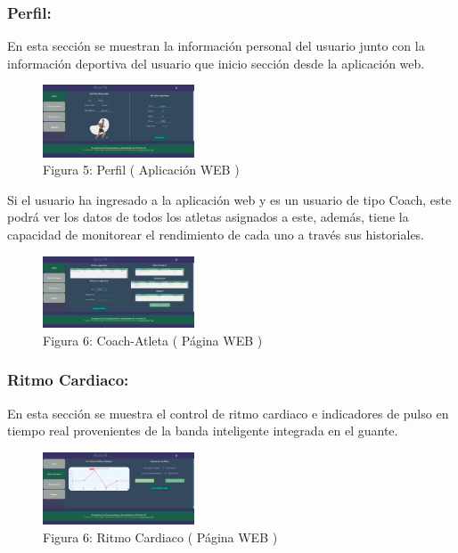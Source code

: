 \documentclass[osajnl,twocolumn,showpacs,superscriptaddress,10pt]{revtex4-1}
\begin{document}
\subsubsection{Perfil:}
    En esta sección se muestran la información personal del usuario junto con la información deportiva del usuario que inicio sección desde la aplicación web.
    
\begin{figure} [H] \centering 
\caption{Figura 5: Perfil ( Aplicación WEB )}
\includegraphics[width=0.4\textwidth]{Perfil.PNG}
\end{figure}

    Si el usuario ha ingresado a la aplicación web y es un usuario de tipo Coach, este podrá ver los datos de todos los atletas asignados a este, además, tiene la capacidad de monitorear el rendimiento de cada uno a través sus historiales.
    
\begin{figure} [H] \centering 
\caption{Figura 6: Coach-Atleta ( Página WEB )}
\includegraphics[width=0.4\textwidth]{CoachAtleta.PNG}
\end{figure}

\subsubsection{Ritmo Cardiaco:}
    En esta sección se muestra el control de ritmo cardiaco e indicadores de pulso en tiempo real provenientes de la banda inteligente integrada en el guante.
    
\begin{figure} [H] \centering 
\caption{Figura 6: Ritmo Cardiaco ( Página WEB )}
\includegraphics[width=0.4\textwidth]{RitmoC.PNG}
\end{figure}
\end{document}
